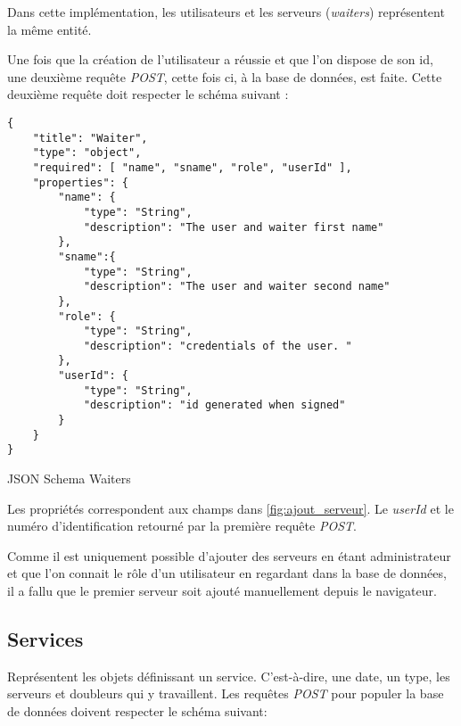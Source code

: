 Dans cette implémentation, les utilisateurs et les serveurs (\textit{waiters}) représentent la même entité.

Une fois que la création de l'utilisateur a réussie et que l'on dispose de son id, une deuxième requête \textit{POST}, cette fois ci, à la base de données, est faite. Cette deuxième requête doit respecter le schéma suivant : 

\begin{listing}[!h]
\begin{verbatim}
{
    "title": "Waiter",
    "type": "object",
    "required": [ "name", "sname", "role", "userId" ],
    "properties": {
        "name": {
            "type": "String",
            "description": "The user and waiter first name"
        },
        "sname":{
            "type": "String",
            "description": "The user and waiter second name"
        },
        "role": {
            "type": "String",
            "description": "credentials of the user. "
        },
        "userId": {
            "type": "String",
            "description": "id generated when signed"
        }   
    }
}
\end{verbatim}
\caption{JSON Schema Waiters}
\label{schema:waiters}
\end{listing}


Les propriétés correspondent aux champs dans \ref{fig:ajout_serveur}. Le \textit{userId} et le numéro d'identification retourné par la première requête \textit{POST}.

Comme il est uniquement possible d'ajouter des serveurs en étant administrateur et que l'on connait le rôle d'un utilisateur en regardant dans la base de données, il a fallu que le premier serveur soit ajouté manuellement depuis le navigateur.
\newpage
\subsection*{Services}
Représentent les objets définissant un service. C'est-à-dire, une date, un type, les serveurs et doubleurs qui y travaillent. Les requêtes \textit{POST} pour populer la base de données doivent respecter le schéma suivant:

